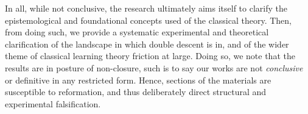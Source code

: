 In all, while not conclusive, the research ultimately aims itself to clarify the epistemological and foundational concepts used of the classical theory. Then, from doing such, we provide a systematic experimental and theoretical clarification of the landscape in which double descent is in, and of the wider theme of classical learning theory friction at large. Doing so, we note that the results are in posture of non-closure, such is to say our works are not \textit{conclusive} or definitive in any restricted form. Hence, sections of the materials are susceptible to reformation, and thus deliberately direct structural and experimental falsification. 
